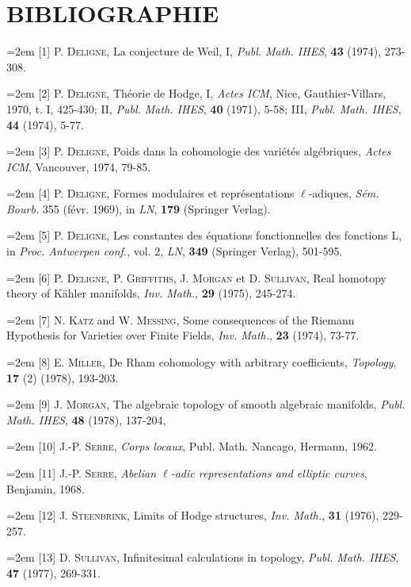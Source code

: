 \documentclass[11pt,leqno]{article}
\begin{document}
\section*{BIBLIOGRAPHIE}

{\small
\noindent\hangindent=2em
[1] P. \textsc{Deligne}, La conjecture de Weil, I, \textit{Publ. Math. IHES}, \textbf{43} (1974), 273-308.

\noindent\hangindent=2em
[2] P. \textsc{Deligne}, Théorie de Hodge, I, \textit{Actes ICM}, Nice, Gauthier-Villars, 1970, t. I, 425-430; II, \textit{Publ. Math. IHES}, \textbf{40} (1971), 5-58; III, \textit{Publ. Math. IHES}, \textbf{44} (1974), 5-77.

\noindent\hangindent=2em
[3] P. \textsc{Deligne}, Poids dans la cohomologie des variétés algébriques, \textit{Actes ICM}, Vancouver, 1974, 79-85.

\noindent\hangindent=2em
[4] P. \textsc{Deligne}, Formes modulaires et représentations \(\ell\)-adiques, \textit{Sém. Bourb.} 355 (févr. 1969), in \textit{LN}, \textbf{179} (Springer Verlag).

\noindent\hangindent=2em
[5] P. \textsc{Deligne}, Les constantes des équations fonctionnelles des fonctions L, in \textit{Proc. Antwerpen conf.}, vol. 2, \textit{LN}, \textbf{349} (Springer Verlag), 501-595.

\noindent\hangindent=2em
[6] P. \textsc{Deligne}, P. \textsc{Griffiths}, J. \textsc{Morgan} et D. \textsc{Sullivan}, Real homotopy theory of Kähler manifolds, \textit{Inv. Math.}, \textbf{29} (1975), 245-274.

\noindent\hangindent=2em
[7] N. \textsc{Katz} and W. \textsc{Messing}, Some consequences of the Riemann Hypothesis for Varieties over Finite Fields, \textit{Inv. Math.}, \textbf{23} (1974), 73-77.

\noindent\hangindent=2em
[8] E. \textsc{Miller}, De Rham cohomology with arbitrary coefficients, \textit{Topology}, \textbf{17} (2) (1978), 193-203.

\noindent\hangindent=2em
[9] J. \textsc{Morgan}, The algebraic topology of smooth algebraic manifolds, \textit{Publ. Math. IHES}, \textbf{48} (1978), 137-204,

\noindent\hangindent=2em
[10] J.-P. \textsc{Serre}, \textit{Corps locaux}, Publ. Math. Nancago, Hermann, 1962.

\noindent\hangindent=2em
[11] J.-P. \textsc{Serre}, \textit{Abelian \(\ell\)-adic representations and elliptic curves}, Benjamin, 1968.

\noindent\hangindent=2em
[12] J. \textsc{Steenbrink}, Limits of Hodge structures, \textit{Inv. Math.}, \textbf{31} (1976), 229-257.

\noindent\hangindent=2em
[13] D. \textsc{Sullivan}, Infinitesimal calculations in topology, \textit{Publ. Math. IHES}, \textbf{47} (1977), 269-331.
\par}
\end{document}
